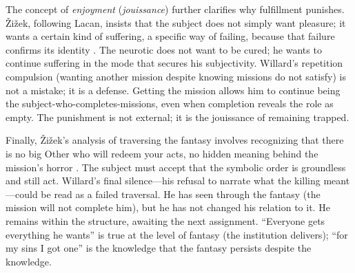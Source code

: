 The concept of \emph{enjoyment} (\emph{jouissance}) further clarifies why fulfillment 
punishes. {\v{Z}}i{\v{z}}ek, following Lacan, insists that the subject does not simply want 
pleasure; it wants a certain kind of suffering, a specific way of failing, because that failure 
confirms its identity \parencite{ZizekSublime1999}. The neurotic does not want to be cured; he 
wants to continue suffering in the mode that secures his subjectivity. Willard's repetition 
compulsion (wanting another mission despite knowing missions do not satisfy) is not a mistake; 
it is a defense. Getting the mission allows him to continue being the subject-who-completes-missions, 
even when completion reveals the role as empty. The punishment is not external; it is the 
jouissance of remaining trapped.

Finally, {\v{Z}}i{\v{z}}ek's analysis of traversing the fantasy involves recognizing that 
there is no big Other who will redeem your acts, no hidden meaning behind the mission's horror 
\parencite{ZizekSublime1999}. The subject must accept that the symbolic order is groundless 
and still act. Willard's final silence---his refusal to narrate what the killing meant---could 
be read as a failed traversal. He has seen through the fantasy (the mission will not complete 
him), but he has not changed his relation to it. He remains within the structure, awaiting the 
next assignment. ``Everyone gets everything he wants'' is true at the level of fantasy (the 
institution delivers); ``for my sins I got one'' is the knowledge that the fantasy persists 
despite the knowledge.

